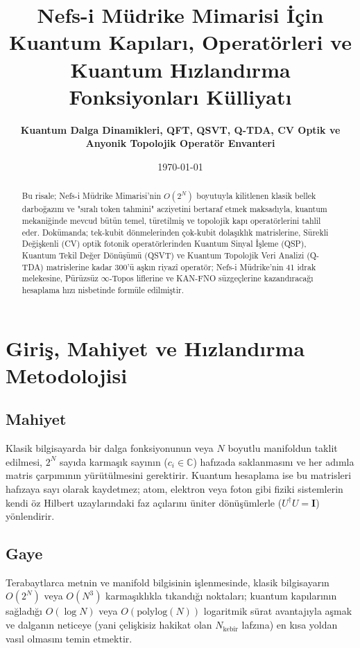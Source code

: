 \documentclass[11pt, a4paper]{article}
\title{\textbf{Nefs-i Müdrike Mimarisi İçin Kuantum Kapıları, Operatörleri ve Kuantum Hızlandırma Fonksiyonları Külliyatı}}
\author{\textbf{Kuantum Dalga Dinamikleri, QFT, QSVT, Q-TDA, CV Optik ve Anyonik Topolojik Operatör Envanteri}}
\date{\today}
\begin{document}
\maketitle

\begin{abstract}
Bu risale; Nefs-i Müdrike Mimarisi'nin $O(2^N)$ boyutuyla kilitlenen klasik bellek darboğazını ve "sıralı token tahmini" acziyetini bertaraf etmek maksadıyla, kuantum mekaniğinde mevcud bütün temel, türetilmiş ve topolojik kapı operatörlerini tahlil eder. Dokümanda; tek-kubit dönmelerinden çok-kubit dolaşıklık matrislerine, Sürekli Değişkenli (CV) optik fotonik operatörlerinden Kuantum Sinyal İşleme (QSP), Kuantum Tekil Değer Dönüşümü (QSVT) ve Kuantum Topolojik Veri Analizi (Q-TDA) matrislerine kadar 300'ü aşkın riyazî operatör; Nefs-i Müdrike'nin 41 idrak melekesine, Pürüzsüz $\infty$-Topos liflerine ve KAN-FNO süzgeçlerine kazandıracağı hesaplama hızı nisbetinde formüle edilmiştir.
\end{abstract}

\tableofcontents
\newpage

\section{Giriş, Mahiyet ve Hızlandırma Metodolojisi}

\subsection{Mahiyet}
Klasik bilgisayarda bir dalga fonksiyonunun veya $N$ boyutlu manifoldun taklit edilmesi, $2^N$ sayıda karmaşık sayının ($c_i \in \mathbb{C}$) hafızada saklanmasını ve her adımla matris çarpımının yürütülmesini gerektirir. Kuantum hesaplama ise bu matrisleri hafızaya sayı olarak kaydetmez; atom, elektron veya foton gibi fiziki sistemlerin kendi öz Hilbert uzaylarındaki faz açılarını üniter dönüşümlerle ($U^\dagger U = \mathbf{I}$) yönlendirir.

\subsection{Gaye}
Terabaytlarca metnin ve manifold bilgisinin işlenmesinde, klasik bilgisayarın $O(2^N)$ veya $O(N^3)$ karmaşıklıkla tıkandığı noktaları; kuantum kapılarının sağladığı $O(\log N)$ veya $O(\text{polylog}(N))$ logaritmik sürat avantajıyla aşmak ve dalganın neticeye (yani çelişkisiz hakikat olan $N_{\text{kebîr}}$ lafzına) en kısa yoldan vasıl olmasını temin etmektir.
\end{document}
